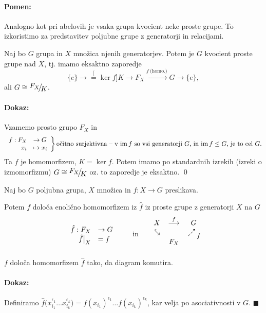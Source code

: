 \paragraph{Pomen:}
Analogno kot pri abelovih je vsaka grupa kvocient neke proste grupe. To izkoristimo za predstavitev poljubne grupe z generatorji
in relacijami.

\begin{lema}
	Naj bo $G$ grupa in $X$ mno\v zica njenih generatorjev. Potem je $G$ kvocient proste grupe nad $X$, tj. imamo eksaktno
	zaporedje
	\[
		\{e\} \to \stackrel[= \ker f]{}{K} \to F_X \stackrel{f\ \text{(homo.)}}{\longrightarrow} G \to \{e\},
	\]
	ali $G \cong \quot{F_X}{K}$.
\end{lema}

\paragraph{Dokaz:}
Vzamemo prosto grupo $F_X$ in
\[
	\left.
	\begin{array}{rl}
		f : F_X &\to G \\
		x_i &\mapsto x_i
	\end{array}\right\} \text{o\v citno surjektivna -- v $\im f$ so vsi generatorji $G$, in $\im f \leq G$, je to cel $G$.}
\]
Ta $f$ je homomorfizem, $K = \ker f$. Potem imamo po standardnih izrekih (izreki o izmomorfizmu) $G \cong \quot{F_X}{K}$ oz. to
zaporedje je eksaktno.
\qed
\begin{posledica}
	Naj bo $G$ poljubna grupa, $X$ mno\v zica in $f : X \to G$ preslikava.\vspace{6pt}
	
	\ni Potem $f$ dolo\v ca enoli\v cno homomorfizem iz $\hat{f}$ iz proste grupe z generatorji $X$ na $G$
	\[
		\left.
			\begin{array}{rl}
				\hat{f}: F_X &\to G \\
				\hat{f}\big|_X &= f
			\end{array}
		\right. \qquad \text{in} \qquad
		\begin{matrix}
			X & \stackrel{f}{\longrightarrow} & G \\
			\sehookarrow &  & \nedasharrow_{\hat{f}} \\
			& \raisebox{2ex}{$F_X$} &
		\end{matrix}
	\]
	$f$ dolo\v ca homomorfizem $\hat{f}$ tako, da diagram komutira.
\end{posledica}

\paragraph{Dokaz:}
Definiramo $\hat{f} \big(x_{i_1}^{\epsilon_1}\ldots x_{i_k}^{\epsilon_k}\big) = f (x_{i_1})^{\epsilon_1}\ldots f
(x_{i_k})^{\epsilon_k}$, kar velja po asociativnosti v $G$. $\blacksquare$

